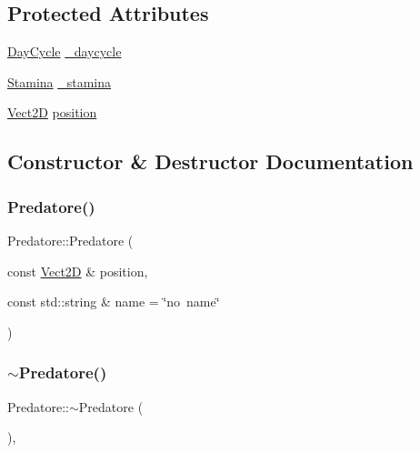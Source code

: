 \subsection*{Protected Attributes}
\begin{DoxyCompactItemize}
\item 
\hyperlink{classDayCycle}{Day\+Cycle} \hyperlink{classFish_a4b8a32e2a5165ddd1f8af27f4346b3eb_a4b8a32e2a5165ddd1f8af27f4346b3eb}{\+\_\+daycycle}
\item 
\hyperlink{classStamina}{Stamina} \hyperlink{classFish_a4948331d0f556344bda8314828eec8dd_a4948331d0f556344bda8314828eec8dd}{\+\_\+stamina}
\item 
\hyperlink{classVect2D}{Vect2D} \hyperlink{classCartesianObject2D_ae02ec6ed11f9bfc0c748da033d6a32f9_ae02ec6ed11f9bfc0c748da033d6a32f9}{position}
\end{DoxyCompactItemize}


\subsection{Constructor \& Destructor Documentation}
\mbox{\label{classPredatore_a8aa157df9ce0145ebd9211e867d27258_a8aa157df9ce0145ebd9211e867d27258}} 
\subsubsection{\texorpdfstring{Predatore()}{Predatore()}}
{\footnotesize\ttfamily Predatore\+::\+Predatore (\begin{DoxyParamCaption}\item[{const \hyperlink{classVect2D}{Vect2D} \&}]{position,  }\item[{const std\+::string \&}]{name = {\ttfamily \char`\"{}no~name\char`\"{}} }\end{DoxyParamCaption})}

\mbox{\label{classPredatore_a72b2c3e53a30cd50693cfeb7c4e838ca_a72b2c3e53a30cd50693cfeb7c4e838ca}} 
\subsubsection{\texorpdfstring{$\sim$\+Predatore()}{~Predatore()}}
{\footnotesize\ttfamily Predatore\+::$\sim$\+Predatore (\begin{DoxyParamCaption}{ }\end{DoxyParamCaption})\hspace{0.3cm}{\ttfamily [virtual]}, {\ttfamily [default]}}



